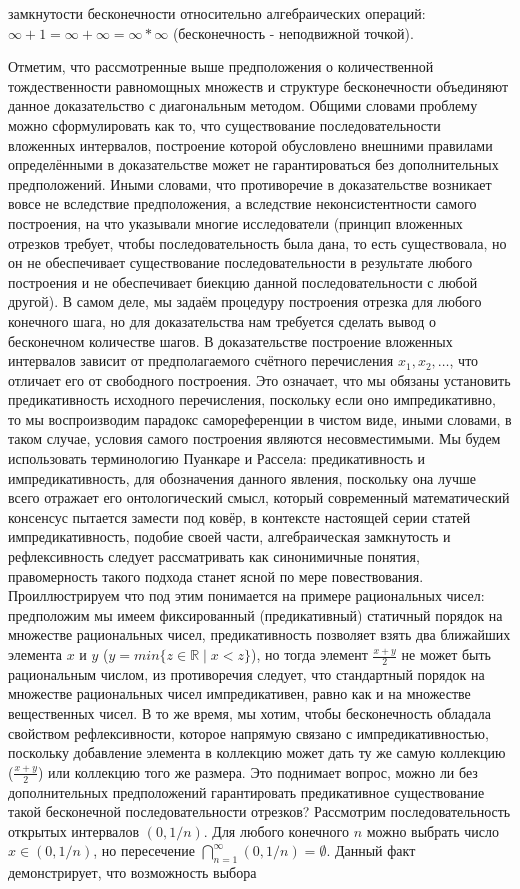 \documentclass[12pt]{article}
\begin{document}
замкнутости бесконечности относительно алгебраических операций: $\infty + 1 = \infty + \infty = \infty * \infty$ (бесконечность - неподвижной точкой). 

Отметим, что рассмотренные выше предположения о количественной тождественности равномощных множеств и структуре бесконечности объединяют данное доказательство с диагональным методом. Общими словами проблему можно сформулировать как то, что существование последовательности вложенных интервалов, построение которой обусловлено внешними правилами определёнными в доказательстве может не гарантироваться без дополнительных предположений. Иными словами, что противоречие в доказательстве возникает вовсе не вследствие предположения, а вследствие неконсистентности самого построения, на что указывали многие исследователи \cite{muckenheim-criticism} (принцип вложенных отрезков требует, чтобы последовательность была дана, то есть существовала, но он не обеспечивает существование последовательности в результате любого построения и не обеспечивает биекцию данной последовательности с любой другой). В самом деле, мы задаём процедуру построения отрезка для любого конечного шага, но для доказательства нам требуется сделать вывод о бесконечном количестве шагов. В доказательстве построение вложенных интервалов зависит от предполагаемого счётного перечисления $x_1, x_2, \dots$, что отличает его от свободного построения. Это означает, что мы обязаны установить предикативность исходного перечисления, поскольку если оно импредикативно, то мы воспроизводим парадокс самореференции в чистом виде, иными словами, в таком случае, условия самого построения являются несовместимыми. Мы будем использовать терминологию Пуанкаре и Рассела: предикативность и импредикативность, для обозначения данного явления, поскольку она лучше всего отражает его онтологический смысл, который современный математический консенсус пытается замести под ковёр, в контексте настоящей серии статей импредикативность, подобие своей части, алгебраическая замкнутость и рефлексивность следует рассматривать как синонимичные понятия, правомерность такого подхода станет ясной по мере повествования. Проиллюстрируем что под этим понимается на примере рациональных чисел: предположим мы имеем фиксированный (предикативный) статичный порядок на множестве рациональных чисел, предикативность позволяет взять два ближайших элемента $x$ и $y$ ($y = min \{ z \in \mathbb{R} \mid x < z \}$), но тогда элемент $\frac{x + y}{2}$ не может быть рациональным числом, из противоречия следует, что стандартный порядок на множестве рациональных чисел импредикативен, равно как и на множестве вещественных чисел. В то же время, мы хотим, чтобы бесконечность обладала свойством рефлексивности, которое напрямую связано с импредикативностью, поскольку добавление элемента в коллекцию может дать ту же самую коллекцию ($\frac{x + y}{2}$) или коллекцию того же размера. Это поднимает вопрос, можно ли без дополнительных предположений гарантировать предикативное существование такой бесконечной последовательности отрезков? Рассмотрим последовательность открытых интервалов $(0, 1/n)$. Для любого конечного $n$ можно выбрать число $x \in (0, 1/n)$, но пересечение $\bigcap\limits_{n = 1}^{\infty} (0, 1/n) = \emptyset$. Данный факт демонстрирует, что возможность выбора 
\end{document}

